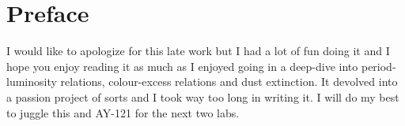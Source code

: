 \documentclass[10pt]{article}
\begin{document}
\section*{Preface}

I would like to apologize for this late work but I had
a lot of fun doing it and I hope you enjoy reading it as
much as I enjoyed going in a deep-dive into period-luminosity relations, colour-excess relations and dust extinction. It devolved into a passion
project of sorts and I took way too long in writing it. I will do my best
to juggle this and AY-121 for the next two labs.
\end{document}
